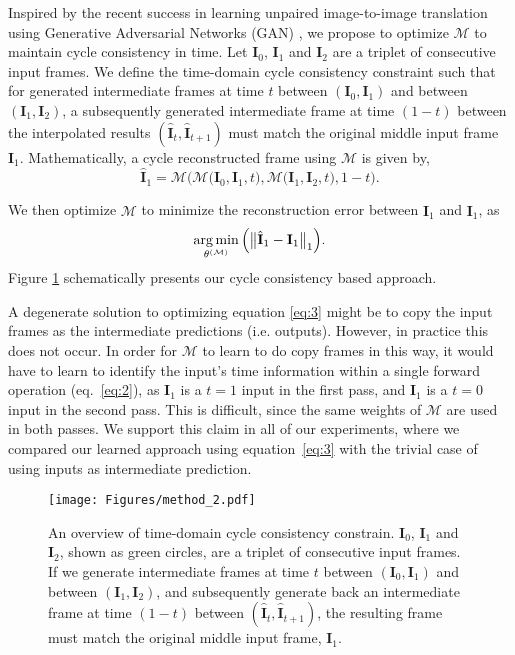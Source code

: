 \documentclass[10pt,twocolumn,letterpaper]{article}
\begin{document}
Inspired by the recent success in learning unpaired image-to-image translation using Generative Adversarial Networks (GAN)  \cite{zhu2017unpaired}, we propose to optimize $\mathcal{M}$ to maintain cycle consistency in time. Let  $\textbf{I}_{0}$, $\textbf{I}_{1}$ and $\textbf{I}_{2}$ are a triplet of consecutive input frames. We define the time-domain cycle consistency constraint such that for generated intermediate frames at time $t$ between $(\textbf{I}_{0}, \textbf{I}_{1})$ and between $(\textbf{I}_{1}, \textbf{I}_{2})$, a subsequently generated intermediate frame at time $(1-t)$ between the interpolated results $(\hat{\textbf{I}}_{t}, \hat{\textbf{I}}_{t+1})$ must match the original middle input frame $\textbf{I}_{1}$. Mathematically, a cycle reconstructed frame using $\mathcal{M}$ is given by, 
\begin{equation} \label{eq:2}
\hat{\textbf{I}}_{1} = \mathcal{M}\Big(\mathcal{M}\big(\textbf{I}_{0},\textbf{I}_{1},t\big),  \mathcal{M}\big(\textbf{I}_{1},\textbf{I}_{2}, t\big), 1-t\Big).
\end{equation}

We then optimize $\mathcal{M}$ to minimize the reconstruction error between $\hat{\textbf{I}}_{1}$ and $\textbf{I}_{1}$, as
\begin{equation} \label{eq:3}
\operatorname*{arg\,min}_{ \bold{\theta}^ { (\mathcal{M}) }  }   \Big(
\big\lVert \hat{\textbf{I}}_{1} - \textbf{I}_{1} \big\rVert_1 \Big).
\end{equation}
\noindent Figure \ref{fig:cycle_consistency_figure} schematically presents our cycle consistency based approach.

A degenerate solution to optimizing equation \ref{eq:3} might be to copy the input frames as the intermediate predictions (i.e. outputs). However, in practice this does not occur. In order for $\mathcal{M}$ to learn to do copy frames in this way, it would have to learn to identify the input's time information within a single forward operation (eq.~\ref{eq:2}), as $\textbf{I}_{1}$ is a $t=1$ input in the first pass, and $\textbf{I}_{1}$ is a $t=0$ input in the second pass. This is difficult, since the same weights of $\mathcal{M}$ are used in both passes. We support this claim in all of our experiments, where we compared our learned approach using equation~\ref{eq:3} with the trivial case of using inputs as intermediate prediction.


\begin{figure}[t]
\centering
\texttt{[image: Figures/method\_2.pdf]}
\caption{An overview of time-domain cycle consistency constrain. $\textbf{I}_{0}$, $\textbf{I}_{1}$ and $\textbf{I}_{2}$, shown as green circles, are a triplet of consecutive input frames. If we generate intermediate frames at time $t$ between $(\textbf{I}_{0}, \textbf{I}_{1})$ and between $(\textbf{I}_{1}, \textbf{I}_{2})$, and subsequently generate back an intermediate frame at time $(1-t)$ between $(\hat{\textbf{I}}_{t}, \hat{\textbf{I}}_{t+1})$, the resulting frame must match the original middle input frame, $\textbf{I}_{1}$.}
\label{fig:cycle_consistency_figure}
\end{figure}
\end{document}
